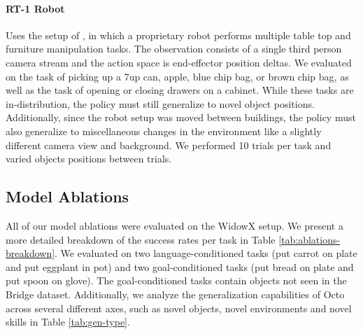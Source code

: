 \begin{appendices}
\paragraph{RT-1 Robot} Uses the setup of \citet{brohan2022rt}, in which a proprietary robot performs multiple table top and furniture manipulation tasks. The observation consists of a single third person camera stream and the action space is end-effector position deltas. We evaluated on the task of picking up a 7up can, apple, blue chip bag, or brown chip bag, as well as the task of opening or closing drawers on a cabinet. While these tasks are in-distribution, the policy must still generalize to novel object positions. Additionally, since the robot setup was moved between buildings, the policy must also generalize to miscellaneous changes in the environment like a slightly different camera view and background. We performed 10 trials per task and varied objects positions between trials.

\subsection{Model Ablations}
All of our model ablations were evaluated on the WidowX setup. We present a more detailed breakdown of the success rates per task in Table \ref{tab:ablations-breakdown}. We evaluated on two language-conditioned tasks (put carrot on plate and put eggplant in pot) and two goal-conditioned tasks (put bread on plate and put spoon on glove). The goal-conditioned tasks contain objects not seen in the Bridge dataset. Additionally, we analyze the generalization capabilities of Octo across several different axes, such as novel objects, novel environments and novel skills in Table \ref{tab:gen-type}.

\begin{table}
\centering
{}
\end{table}
\end{appendices}
